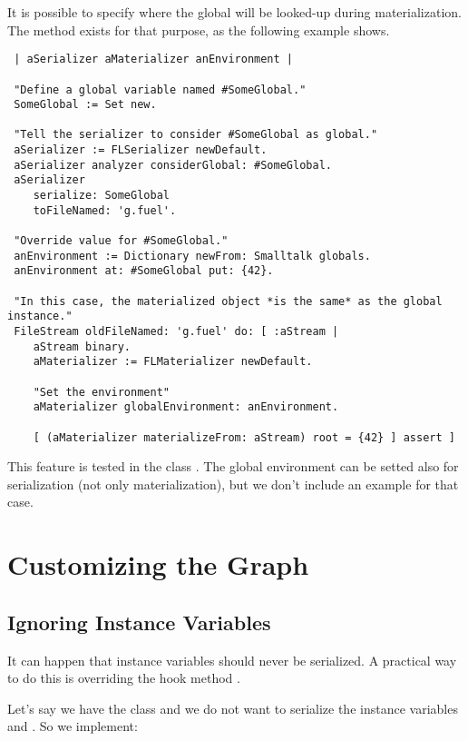 \documentclass[a4paper,10pt,twoside]{book}
\begin{document}
It is possible to specify where the global will be looked-up during materialization. The method  exists for that purpose, as the following example shows. 

\begin{lstlisting}
 | aSerializer aMaterializer anEnvironment |
 
 "Define a global variable named #SomeGlobal."
 SomeGlobal := Set new.
 
 "Tell the serializer to consider #SomeGlobal as global."
 aSerializer := FLSerializer newDefault.
 aSerializer analyzer considerGlobal: #SomeGlobal.
 aSerializer 
 	serialize: SomeGlobal 
 	toFileNamed: 'g.fuel'.
 
 "Override value for #SomeGlobal."
 anEnvironment := Dictionary newFrom: Smalltalk globals.
 anEnvironment at: #SomeGlobal put: {42}.
 
 "In this case, the materialized object *is the same* as the global instance."
 FileStream oldFileNamed: 'g.fuel' do: [ :aStream |
 	aStream binary.
 	aMaterializer := FLMaterializer newDefault.
 	
 	"Set the environment"
 	aMaterializer globalEnvironment: anEnvironment.
 
 	[ (aMaterializer materializeFrom: aStream) root = {42} ] assert ]
\end{lstlisting}

This feature is tested in the class . The global environment can be setted also for serialization (not only materialization), but we don't include an example for that case.



\section{Customizing the Graph}

\subsection{Ignoring Instance Variables}

It can happen that instance variables should never be serialized. A practical way to do this is overriding the hook method . 

Let's say we have the class  and we do not want to serialize the instance variables  and . So we implement:
\end{document}
